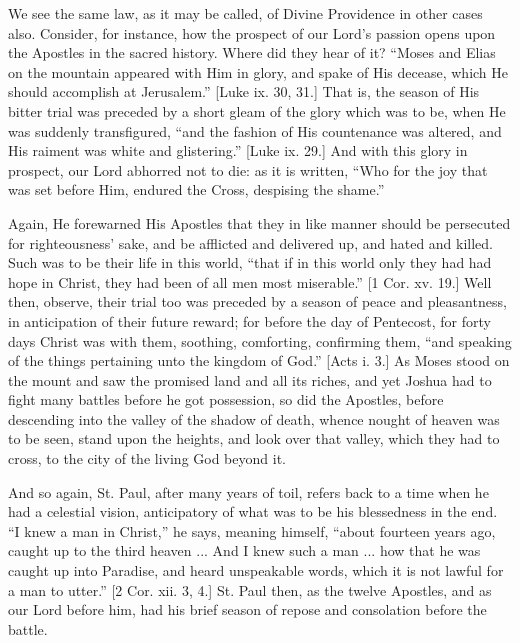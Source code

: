 We see the same law, as it may be called, of Divine Providence in
other cases also. Consider, for instance, how the prospect of our
Lord's passion opens upon the Apostles in the sacred history. Where
did they hear of it? ``Moses and Elias on the mountain appeared
with Him in glory, and spake of His decease, which He should
accomplish at Jerusalem.'' [Luke ix. 30, 31.] That is, the season
of His bitter trial was preceded by a short gleam of the glory which
was to be, when He was suddenly transfigured, ``and the fashion of
His countenance was altered, and His raiment was white and
glistering.'' [Luke ix. 29.] And with this glory in prospect, our
Lord abhorred not to die: as it is written, ``Who for the joy that
was set before Him, endured the Cross, despising the shame.''

Again, He forewarned His Apostles that they in like manner should
be persecuted for righteousness' sake, and be afflicted and delivered
up, and hated and killed. Such was to be their life in this world,
``that if in this world only they had had hope in Christ, they had
been of all men most miserable.'' [1 Cor. xv. 19.] Well then,
observe, their trial too was preceded by a season of peace and
pleasantness, in anticipation of their future reward; for before the
day of Pentecost, for forty days Christ was with them, soothing,
comforting, confirming them, ``and speaking of the things
pertaining unto the kingdom of God.'' [Acts i. 3.] As Moses stood
on the mount and saw the promised land and all its riches, and yet
Joshua had to fight many battles before he got possession, so did the
Apostles, before descending into the valley of the shadow of death,
whence nought of heaven was to be seen, stand upon the heights, and
look over that valley, which they had to cross, to the city of the
living God beyond it.

And so again, St. Paul, after many years of toil, refers back to a
time when he had a celestial vision, anticipatory of what was to be
his blessedness in the end. ``I knew a man in Christ,'' he
says, meaning himself, ``about fourteen years ago, caught up to
the third heaven ... And I knew such a man ... how that he was caught
up into Paradise, and heard unspeakable words, which it is not lawful
for a man to utter.'' [2 Cor. xii. 3, 4.] St. Paul then, as the
twelve Apostles, and as our Lord before him, had his brief season of
repose and consolation before the battle.


